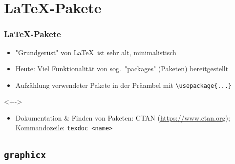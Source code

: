 \section{\LaTeX-Pakete}

\begin{frame}[<+->][fragile]
	\frametitle{\LaTeX-Pakete}
	
	\lstset{frame=L, numbers=left, xleftmargin=0.5cm}
	\begin{itemize}
		\item "Grundgerüst" von \LaTeX\ ist sehr alt, minimalistisch
		\item Heute: Viel Funktionalität von sog.\ "packages" (Paketen) bereitgestellt
		\item Aufzählung verwendeter Pakete in der Präambel mit \lstinline!\usepackage{...}!		
	\end{itemize}
	
	
	\begin{visibleenv}<+->
		\hspace{0.5cm}
	\end{visibleenv}
	
	\begin{itemize}
		\item Dokumentation \& Finden von Paketen: CTAN (\url{https://www.ctan.org}); Kommandozeile: \texttt{texdoc <name>}
	\end{itemize}
\end{frame}

\subsection{\texttt{graphicx}}

